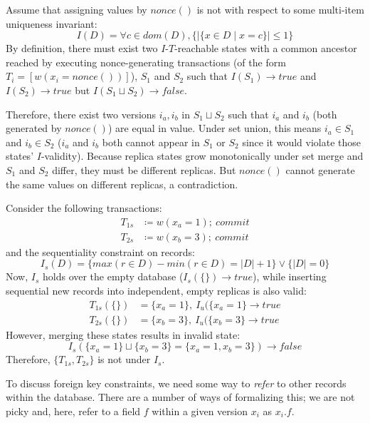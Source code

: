 \begin{claim}
\label{claim:nunique}

Assume that assigning values by $nonce()$ is not \iconfluent with respect to some multi-item uniqueness invariant:
$$I(D) = \forall c \in dom(D), \{|\{x \in D \mid x = c\}| \leq 1 \}$$
By definition, there must exist two $I$-$T$-reachable states with a common ancestor reached by executing nonce-generating transactions (of the form $T_i=[w(x_i = nonce())]$), $S_1$ and $S_2$ such that $I(S_1) \rightarrow true$ and $I(S_2) \rightarrow true$ but $I(S_1 \sqcup S_2) \rightarrow false$.

Therefore, there exist two versions $i_a, i_b$ in $S_1 \sqcup S_2$ such that $i_a$ and $i_b$ (both generated by $nonce()$) are equal in value. Under set union, this means $i_a \in S_1$ and $i_b \in S_2$ ($i_a$ and $i_b$ both cannot appear in $S_1$ or $S_2$ since it would violate those states' $I$-validity). Because replica states grow monotonically under set merge and $S_1$ and $S_2$ differ, they must be different replicas. But $nonce()$ cannot generate the same values on different replicas, a contradiction. \end{claim}

\begin{claim}
\label{claim:nseq-insert}
Consider the following transactions:
\begin{align*}
T_{1s}&\coloneqq w(x_a=1);~commit\\
T_{2s}&\coloneqq w(x_b=3);~commit
\end{align*}
and the sequentiality constraint on records:
$$I_s(D) =\{max(r\in D)-min(r\in D) = |D|+1\} \vee \{|D|=0\}$$
Now, $I_s$ holds over the empty database ($I_s(\{\}) \rightarrow true$), while inserting sequential new records into independent, empty replicas is also valid:
\begin{align*}
T_{1s}(\{\})&=\{x_a=1\},~I_u(\{x_a=1\} \rightarrow true\\
T_{2s}(\{\})&=\{x_b=3\},~I_u(\{x_b=3\} \rightarrow true
\end{align*}
However, merging these states results in invalid state:
$$I_s(\{x_a=1\}\sqcup \{x_b=3\} = \{x_a=1, x_b=3\}) \rightarrow false$$
Therefore, $\{T_{1s}, T_{2s}\}$ is not \iconfluent under $I_s$.
\end{claim}

To discuss foreign key constraints, we need some way to \textit{refer} to other records within the database. There are a number of ways of formalizing this; we are not picky and, here, refer to a field $f$ within a given version $x_i$ as $x_i.f$.

